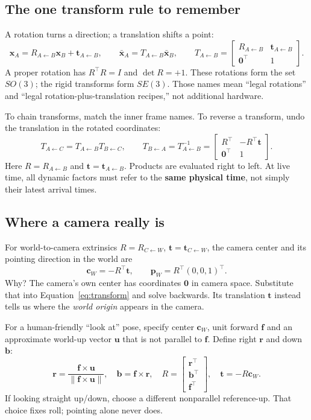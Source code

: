 \documentclass[11pt,a4paper]{article}
\newcommand{\T}[2]{T_{#1\leftarrow #2}}
\newcommand{\Rot}[2]{R_{#1\leftarrow #2}}
\newcommand{\tr}[2]{\bm{t}_{#1\leftarrow #2}}
\newcommand{\pt}[1]{\bm{x}_{#1}}
\newcommand{\hpt}[1]{\bar{\bm{x}}_{#1}}
\begin{document}
\subsection{The one transform rule to remember}
A rotation turns a direction; a translation shifts a point:
\begin{equation}
\pt{A}=\Rot{A}{B}\pt{B}+\tr{A}{B},\qquad
\hpt{A}=\T{A}{B}\hpt{B},\qquad
\T{A}{B}=
\begin{bmatrix}\Rot{A}{B}&\tr{A}{B}\\\bm{0}^\top&1\end{bmatrix}.
\label{eq:transform}
\end{equation}
A proper rotation has $R^\top R=I$ and $\det R=+1$.
These rotations form the set $SO(3)$; the rigid transforms form $SE(3)$.
Those names mean ``legal rotations'' and ``legal rotation-plus-translation
recipes,'' not additional hardware.

To chain transforms, match the inner frame names. To reverse a transform,
undo the translation in the rotated coordinates:
\begin{equation}
\T{A}{C}=\T{A}{B}\T{B}{C},\qquad
\T{B}{A}=\T{A}{B}^{-1}
=\begin{bmatrix}R^\top&-R^\top\bm{t}\\\bm{0}^\top&1\end{bmatrix}.
\label{eq:compose}
\end{equation}
Here $R=\Rot{A}{B}$ and $\bm{t}=\tr{A}{B}$. Products are evaluated
right to left. At live time, all dynamic factors must refer to the
\textbf{same physical time}, not simply their latest arrival times.

\subsection{Where a camera really is}
For world-to-camera extrinsics $R=\Rot{C}{W}$, $\bm{t}=\tr{C}{W}$,
the camera center and its pointing direction in the world are
\begin{equation}
\bm{c}_W=-R^\top\bm{t},\qquad
\bm{p}_W=R^\top(0,0,1)^\top.
\label{eq:center}
\end{equation}
Why? The camera's own center has coordinates $\bm{0}$ in camera space.
Substitute that into Equation~\eqref{eq:transform} and solve backwards.
Its translation $\bm{t}$ instead tells us where the \emph{world origin}
appears in the camera.

For a human-friendly ``look at'' pose, specify center $\bm{c}_W$,
unit forward $\bm{f}$ and an approximate world-up vector $\bm{u}$ that is
not parallel to $\bm{f}$. Define right $\bm{r}$ and down $\bm{b}$:
\begin{equation}
\bm{r}=\frac{\bm{f}\times\bm{u}}{\|\bm{f}\times\bm{u}\|},
\quad \bm{b}=\bm{f}\times\bm{r},\quad
R=\begin{bmatrix}\bm{r}^\top\\\bm{b}^\top\\\bm{f}^\top\end{bmatrix},
\quad \bm{t}=-R\bm{c}_W.
\end{equation}
If looking straight up/down, choose a different nonparallel reference-up.
That choice fixes roll; pointing alone never does.
\end{document}
